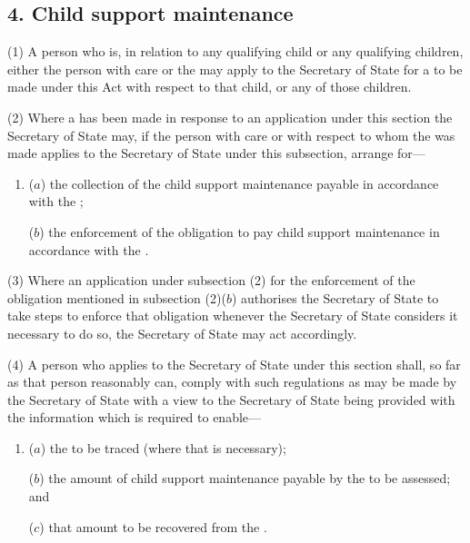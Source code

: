 \documentclass[a4paper]{article}
\begin{document}
\subsection{4. Child support maintenance}

(1) A
person who is, in relation to any qualifying child or any qualifying
children, either the person with care or the 
may
apply to the Secretary of State for a 
to be made under this Act with respect to that child, or any of those
children.

(2)
Where a 
has been made in
response to an application under this section the Secretary of State may, if the
person with care or 
with respect to whom the
was made applies to the Secretary of State under this
subsection, arrange for---
\begin{enumerate}\item[]
($a$)
the collection of the child support maintenance payable in accordance
with the ;

($b$)
the enforcement of the obligation to pay child support maintenance in
accordance with the .

\end{enumerate}

(3)
Where an application under subsection (2) for the enforcement of the
obligation mentioned in subsection (2)($b$) authorises the Secretary of State to take
steps to enforce that obligation whenever the Secretary of State considers it
necessary to do so, the Secretary of State may act accordingly.

(4)
A person who applies to the Secretary of State under this section shall, so
far as that person reasonably can, comply with such regulations as may be made
by the Secretary of State with a view to the Secretary of State being provided
with the information which is required to enable---

\begin{enumerate}\item[]
($a$)
the 
to be %
traced (where
that is necessary);

($b$)
the amount of child support maintenance payable by the 
to be assessed; and

($c$)
that amount to be recovered from the .
\end{enumerate}
\end{document}

